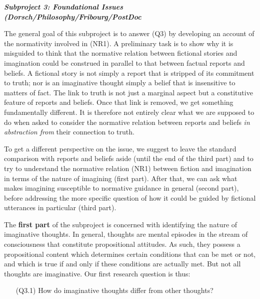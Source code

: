 \vspace{.2cm}
\noindent\textbf{\emph{Subproject 3: Foundational Issues (Dorsch/Philosophy/Fribourg/PostDoc}}
\vspace{.1cm}

\noindent The general goal of this subproject is to answer (Q3) by developing an account of the normativity involved in (NR1). A preliminary task is to show why it is misguided to think that the normative relation between fictional stories and imagination could be construed in parallel to that between factual reports and beliefs. A fictional story is not simply a report that is stripped of its commitment to truth; nor is an imaginative thought simply a belief that is insensitive to matters of fact. The link to truth is not just a marginal aspect but a constitutive feature of reports and beliefs. Once that link is removed, we get something fundamentally different. It is therefore not entirely clear what we are supposed to do when asked to consider the normative relation between reports and beliefs \emph{in abstraction from} their connection to truth.

To get a different perspective on the issue, we suggest to leave the standard comparison with reports and beliefs aside (until the end of the third part) and to try to understand the normative relation (NR1) between fiction and imagination in terms of the nature of imagining (first part). After that, we can ask what makes imagining susceptible to normative guidance in general (second part), before addressing the more specific question of how it could be guided by fictional utterances in particular (third part).

The \textbf{first part} of the subproject is concerned with identifying the nature of imaginative thoughts. In general, thoughts are mental episodes in the stream of consciousness that constitute propositional attitudes. As such, they possess a propositional content which determines certain conditions that can be met or not, and which is true if and only if these conditions are actually met. But not all thoughts are imaginative. Our first research question is thus:

\vspace{-.1cm}
\begin{itemize}[leftmargin=2cm]
\item[(Q3.1)] How do imaginative thoughts differ from other thoughts?
\end{itemize}
\vspace{-.1cm}

